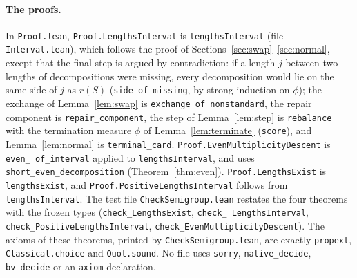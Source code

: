 \documentclass[11pt]{article}
\theoremstyle{definition}
\theoremstyle{remark}
\begin{document}
{\paragraph{The proofs.}
In \texttt{Proof.lean}, \texttt{Proof.LengthsInterval} is
\texttt{lengthsInterval} (file \texttt{Interval.lean}), which follows the
proof of Sections~\ref{sec:swap}--\ref{sec:normal}, except that the final step
is argued by contradiction: if a length $j$ between two lengths of
decompositions were missing, every decomposition would lie on the same side
of $j$ as $r(S)$ (\texttt{side\_\allowbreak of\_\allowbreak missing}, by strong
induction on $\phi$); the exchange of Lemma~\ref{lem:swap} is
\texttt{exchange\_\allowbreak of\_\allowbreak nonstandard}, the repair
component is \texttt{repair\_\allowbreak component}, the step of
Lemma~\ref{lem:step} is \texttt{rebalance} with the termination measure
$\phi$ of Lemma~\ref{lem:terminate} (\texttt{score}), and
Lemma~\ref{lem:normal} is \texttt{terminal\_\allowbreak card}.
\texttt{Proof.EvenMultiplicityDescent} is \texttt{even\_\allowbreak
of\_\allowbreak interval} applied to \texttt{lengthsInterval}, and uses
\texttt{short\_\allowbreak even\_\allowbreak decomposition}
(Theorem~\ref{thm:even}). \texttt{Proof.LengthsExist} is
\texttt{lengthsExist}, and \texttt{Proof.PositiveLengthsInterval} follows
from \texttt{lengthsInterval}. The test file \texttt{CheckSemigroup.lean}
restates the four theorems with the frozen types
(\texttt{check\_\allowbreak LengthsExist}, \texttt{check\_\allowbreak
LengthsInterval}, \texttt{check\_\allowbreak PositiveLengthsInterval},
\texttt{check\_\allowbreak EvenMultiplicityDescent}). The axioms of these
theorems, printed by \texttt{CheckSemigroup.lean}, are exactly \texttt{propext},
\texttt{Classical.choice} and \texttt{Quot.sound}. No file uses
\texttt{sorry}, \texttt{native\_\allowbreak decide},
\texttt{bv\_\allowbreak decide} or an \texttt{axiom} declaration.

}
\end{document}
